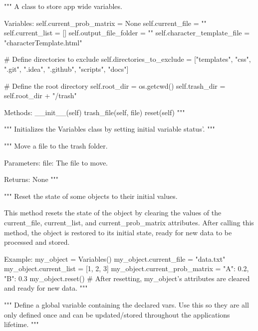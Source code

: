 \begin{classbox}
"""
A class to store app wide variables.

Variables:
	self.current_prob_matrix = None
	self.current_file = ""
	self.current_list = []
	self.output_file_folder = ""
	self.character_template_file = "characterTemplate.html"
	
	# Define directories to exclude
	self.directories_to_exclude = ["templates", "css", ".git", ".idea", ".github", "scripts", "docs"]
	
	# Define the root directory
	self.root_dir = os.getcwd()
	self.trash_dir = self.root_dir + "/trash"
	
Methods:
	__init__(self)
	trash_file(self, file)
	reset(self)
"""
\end{classbox}

\begin{codebox}
"""
Initializes the Variables class by setting initial variable status'.
"""
\end{codebox}

\begin{codebox}
"""
Move a file to the trash folder.

Parameters:
    file: The file to move.
    
Returns: 
    None
"""
\end{codebox}

\begin{codebox}
"""
Reset the state of some objects to their initial values.

This method resets the state of the object by clearing the values of the current_file, current_list,
and current_prob_matrix attributes. After calling this method, the object is restored to its initial
state, ready for new data to be processed and stored.

Example:
    my_object = Variables()
    my_object.current_file = "data.txt"
    my_object.current_list = [1, 2, 3]
    my_object.current_prob_matrix = {"A": 0.2, "B": 0.3}
    my_object.reset()
    # After resetting, my_object's attributes are cleared and ready for new data.
"""
\end{codebox}

\begin{codebox}[global\_vars = Variables()]
"""
Define a global variable containing the declared vars. Use this so they are all only defined once and can be updated/stored throughout the applications lifetime.
"""
\end{codebox}

